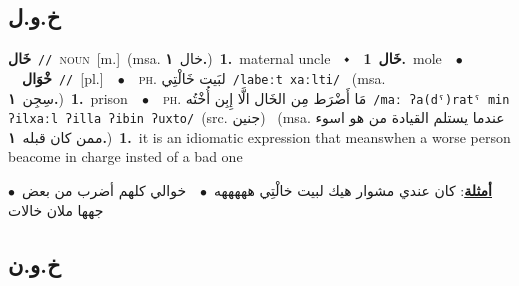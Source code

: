 \documentclass[10pt,a4paper,twoside]{article} %
\begin{document}
\begin{multicols}{2}
\vspace{-3mm}
\subsection*{\color{blue}\foreignlanguage{arabic}{خ.و.ل}\color{blue}{ (ntws)}} 

{\setlength\topsep{0pt}\textbf{\foreignlanguage{arabic}{خَال}}\ {\color{gray}\texttt{//}\color{black}}\ \textsc{noun}\ [m.]\ \color{gray}(msa. \foreignlanguage{arabic}{خال}~\foreignlanguage{arabic}{\textbf{١.}})\color{black}\ \textbf{1.}~maternal uncle\ \ $\smblkdiamond$\ \ \setlength\topsep{0pt}\textbf{\foreignlanguage{arabic}{خَال}}\ \textbf{1.}~mole\ \ $\bullet$\ \ \setlength\topsep{0pt}\textbf{\foreignlanguage{arabic}{خْوَال}}\ {\color{gray}\texttt{//}\color{black}}\ [pl.]\ \ $\bullet$\ \ \textsc{ph.} \color{gray} \foreignlanguage{arabic}{لبَيت خَالْتِي}\color{black}\ {\color{gray}\texttt{/{\sffamily labeːt xaːlti}/}\color{black}}\ \color{gray} (msa. \foreignlanguage{arabic}{سِجِن}~\foreignlanguage{arabic}{\textbf{١.}})\color{black}\ \textbf{1.}~prison\ \ $\bullet$\ \ \textsc{ph.} \color{gray} \foreignlanguage{arabic}{مَا أَضْرَط مِن الخَال الَّا إِبِن أُخْتُه}\color{black}\ {\color{gray}\texttt{/{\sffamily maː ʔa(dˤ)ratˤ min ʔilxaːl ʔilla ʔibin ʔuxto}/}\color{black}}\ \color{gray}(src. \foreignlanguage{arabic}{جنين})\color{black}\ \color{gray} (msa. \foreignlanguage{arabic}{عندما يستلم القيادة من هو اسوء ممن كان قبله}~\foreignlanguage{arabic}{\textbf{١.}})\color{black}\ \textbf{1.}~it is an idiomatic expression that meanswhen a worse person beacome in charge insted of a bad one\  \begin{flushright}\color{gray}\foreignlanguage{arabic}{\textbf{\underline{\foreignlanguage{arabic}{أمثلة}}}: كان عندي مشوار هيك لبيت خالْتِي هههههه\ $\bullet$\ \  خوالي كلهم أضرب من بعض\ $\bullet$\ \  جهها ملان خالات}\end{flushright}\color{black}} \vspace{2mm}

\vspace{-3mm}
\subsection*{\color{blue}\foreignlanguage{arabic}{خ.و.ن}\color{blue}{}} 


\end{multicols}
\end{document}
